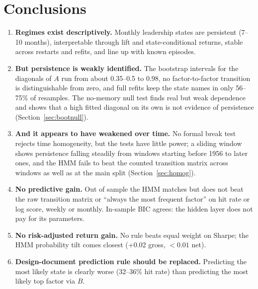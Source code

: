 \documentclass[11pt]{article}
\begin{document}
\section{Conclusions}
\begin{enumerate}
\item \textbf{Regimes exist descriptively.} Monthly leadership states are persistent (7--10 months), interpretable through lift and state-conditional returns, stable across restarts and refits, and line up with known episodes.
\item \textbf{But persistence is weakly identified.} The bootstrap intervals for the diagonals of $A$ run from about 0.35--0.5 to 0.98, no factor-to-factor transition is distinguishable from zero, and full refits keep the state names in only 56--75\% of resamples. The no-memory null test finds real but weak dependence and shows that a high fitted diagonal on its own is not evidence of persistence (Section~\ref{sec:bootnull}).
\item \textbf{And it appears to have weakened over time.} No formal break test rejects time homogeneity, but the tests have little power; a sliding window shows persistence falling steadily from windows starting before 1956 to later ones, and the HMM fails to beat the counted transition matrix across windows as well as at the main split (Section~\ref{sec:homog}).
\item \textbf{No predictive gain.} Out of sample the HMM matches but does not beat the raw transition matrix or ``always the most frequent factor'' on hit rate or log score, weekly or monthly. In-sample BIC agrees: the hidden layer does not pay for its parameters.
\item \textbf{No risk-adjusted return gain.} No rule beats equal weight on Sharpe; the HMM probability tilt comes closest (+0.02 gross, $<0.01$ net).
\item \textbf{Design-document prediction rule should be replaced.} Predicting the most likely state is clearly worse (32--36\% hit rate) than predicting the most likely top factor via $B$.
\end{enumerate}
\end{document}
